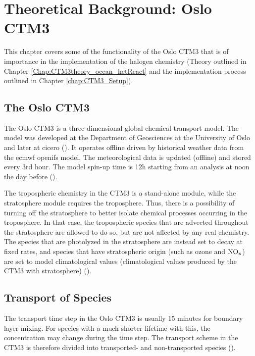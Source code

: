 \setcounter{chapter}{3}
\chapter{Theoretical Background: Oslo CTM3}\label{chapt:OsloCTM3}

This chapter covers some of the functionality of the Oslo CTM3 that is of importance in the implementation of the halogen chemistry (Theory outlined in Chapter \ref{Chap:CTM3theory_ocean_hetReact} and the implementation process outlined in Chapter \ref{chap:CTM3_Setup}).

\section{The Oslo CTM3}

The Oslo CTM3 is a three-dimensional global chemical transport model. The model was developed at the Department of Geosciences at the University of Oslo and later at \acrfull{cicero} (\cite{SovdeManual}). It operates offline driven by historical weather data from the \acrfull{ecmwf} \acrfull{openifs} model. The meteorological data is updated (offline) and stored every 3rd hour. The model spin-up time is 12h starting from an analysis at noon the day before (\cite{Sovde2012}). 

\medskip

The tropospheric chemistry in the CTM3 is a stand-alone module, while the stratosphere module requires the troposphere. Thus, there is a possibility of turning off the stratosphere to better isolate chemical processes occurring in the troposphere. In that case, the tropospheric species that are advected throughout the stratosphere are allowed to do so, but are not affected by any real chemistry. The species that are photolyzed in the stratosphere are instead set to decay at fixed rates, and species that have stratospheric origin (such as ozone and $\mathrm{NO_x}$) are set to model climatological values (climatological values produced by the CTM3 with stratosphere) (\cite{Sovde2012}).

\section{Transport of Species}\label{sec:CTM3_transport}

The transport time step in the Oslo CTM3 is usually 15 minutes for boundary layer mixing. For species with a much shorter lifetime with this, the concentration may change during the time step. The transport scheme in the CTM3 is therefore divided into transported- and non-transported species (\cite{SovdeManual}).

